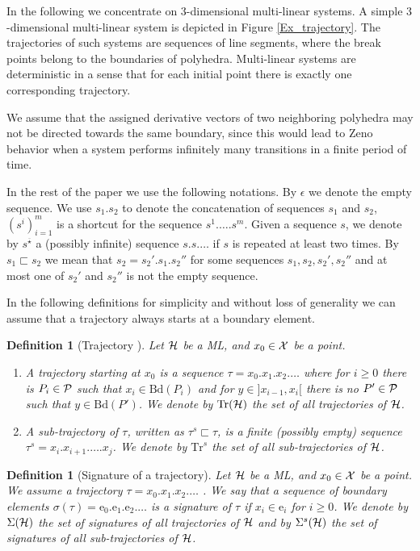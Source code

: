 \documentclass[copyright,creativecommons]{packages/eptcs}
\newcommand{\ml}{\mbox{ML}}
\newcommand{\bd}{{\mbox{Bd}}}
\newcommand{\traj}{\tau}
\newcommand{\seq}{\overline{\star}}
\newcommand{\sgn}{\Sigma}
\newcommand{\Trj}{\mbox{Tr}}
\newcommand{\ssignat}{\sgn^s}
\newcommand{\be}{\mbox{e}}
\newtheorem{definition}[theorem]{Definition}
\begin{document}
In the following we concentrate on $3$-dimensional multi-linear  systems. A simple $3$-dimensional multi-linear system  is depicted in Figure \ref{Ex_trajectory}. 
 The trajectories of such systems are sequences of line segments, where the break points belong to the boundaries of  polyhedra. 
Multi-linear systems are deterministic in a sense that for  each initial point there is exactly one corresponding trajectory. 

We assume that the assigned derivative vectors of two neighboring polyhedra may not be directed towards the same boundary,
since this would lead to Zeno behavior when   a system performs infinitely many transitions in a finite period of time.



In the rest of the paper we use the following notations. By $\epsilon$ we denote the empty sequence. 
We use $s_1.s_2$ to denote the concatenation of sequences $s_1$ and $s_2$,   $(s^i)_{i=1}^m$ is a shortcut for the sequence $s^1.\dots.s^m$. Given a sequence $s$, we denote by $s^{\seq}$  a (possibly infinite) sequence $s. s. \dots$ if  $s$ is repeated at least two times. By $s_1\sqsubset s_2$ we mean that $s_2=s_2'.s_1.s_2''$ for some sequences $s_1,s_2,s_2',s_2''$ and at most one of $s_2'$ and $s_2''$ is not the empty sequence. 

In the following definitions  for simplicity and without loss of generality we can assume that a trajectory always starts at a boundary element. 

\begin{definition}[Trajectory ] Let  $\cal{H}$ be a \ml, and $x_0\in \cal{X}$ be a point.
\begin{enumerate} 
\item A trajectory starting at  $x_0$ is a  sequence  $\traj=x_0.x_1.x_2. \dots$
where for  $i\geq 0$ there is  $P_i\in \cal P$ such that   $x_i\in \bd(P_i)$ and for  $y\in ]x_{i-1},x_{i}[$ there is no $P'\in \cal P$ such that   $y\in \bd(P')$. We denote by $\Trj(\cal H)$ the set of all trajectories of $\cal{H}$. 

\item  A sub-trajectory of $\traj$, written as $\traj^s\sqsubset\traj$,  is a finite (possibly empty) sequence 
$\traj^s= x_i. x_{i+1}.\dots. x_{j}$.  We denote by $\Trj^s$ the set of all sub-trajectories of $\cal{H}$. 

\end{enumerate}
\end{definition}


\begin{definition}[Signature of a trajectory]
Let  $\cal{H}$ be a \ml, and $x_0\in \cal{X}$ be a point. We assume a trajectory  $\traj=x_0.x_1.x_2. \dots$ .  We say that a sequence of boundary elements $\sigma(\traj)=\be_0. \be_1. \be_2. \dots$ is  a signature of $\traj$ if  $x_i\in\be_i$ for $i\geq 0$.  We denote by $\sgn(\cal{H})$ the set of signatures of all trajectories of $\cal{H}$ and by $\ssignat(\cal H)$ the set of signatures of all sub-trajectories of $\cal{H}$.
 \end{definition}
\end{document}
